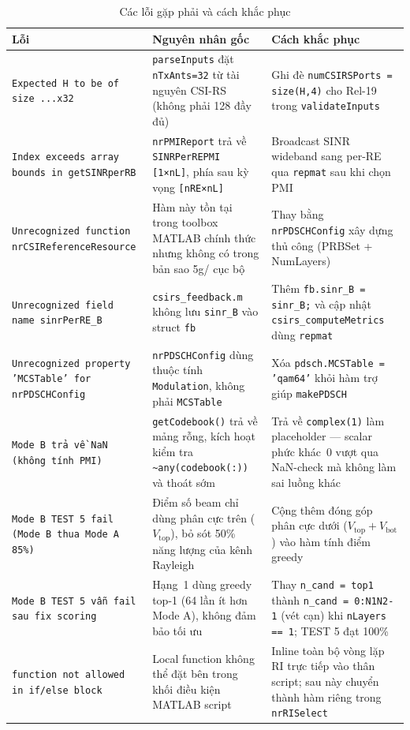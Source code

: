 \documentclass[11pt,a4paper]{article}
\begin{document}
\begin{table}[h!]
\centering
\caption{Các lỗi gặp phải và cách khắc phục}
\label{tab:errors}
\begin{tabular}{p{4cm}p{5cm}p{5cm}}
\toprule
\textbf{Lỗi} & \textbf{Nguyên nhân gốc} & \textbf{Cách khắc phục} \\
\midrule
\texttt{Expected H to be of size ...x32} &
\texttt{parseInputs} đặt \texttt{nTxAnts=32} từ tài nguyên CSI-RS (không phải 128 đầy đủ) &
Ghi đè \texttt{numCSIRSPorts = size(H,4)} cho Rel-19 trong \texttt{validateInputs} \\
\addlinespace
\texttt{Index exceeds array bounds in getSINRperRB} &
\texttt{nrPMIReport} trả về \texttt{SINRPerREPMI [1×nL]}, phía sau kỳ vọng \texttt{[nRE×nL]} &
Broadcast SINR wideband sang per-RE qua \texttt{repmat} sau khi chọn PMI \\
\addlinespace
\texttt{Unrecognized function nrCSIReferenceResource} &
Hàm này tồn tại trong toolbox MATLAB chính thức nhưng không có trong bản sao 5g/ cục bộ &
Thay bằng \texttt{nrPDSCHConfig} xây dựng thủ công (PRBSet + NumLayers) \\
\addlinespace
\texttt{Unrecognized field name sinrPerRE\_B} &
\texttt{csirs\_feedback.m} không lưu \texttt{sinr\_B} vào struct \texttt{fb} &
Thêm \texttt{fb.sinr\_B = sinr\_B;} và cập nhật \texttt{csirs\_computeMetrics} dùng \texttt{repmat} \\
\addlinespace
\texttt{Unrecognized property 'MCSTable' for nrPDSCHConfig} &
\texttt{nrPDSCHConfig} dùng thuộc tính \texttt{Modulation}, không phải \texttt{MCSTable} &
Xóa \texttt{pdsch.MCSTable = 'qam64'} khỏi hàm trợ giúp \texttt{makePDSCH} \\
\addlinespace
\texttt{Mode B trả về NaN (không tính PMI)} &
\texttt{getCodebook()} trả về mảng rỗng, kích hoạt kiểm tra \texttt{\textasciitilde any(codebook(:))} và thoát sớm &
Trả về \texttt{complex(1)} làm placeholder --- scalar phức khác~0 vượt qua NaN-check mà không làm sai luồng khác \\
\addlinespace
\texttt{Mode B TEST 5 fail (Mode B thua Mode A 85\%)} &
Điểm số beam chỉ dùng phân cực trên ($V_\text{top}$), bỏ sót 50\% năng lượng của kênh Rayleigh &
Cộng thêm đóng góp phân cực dưới ($V_\text{top} + V_\text{bot}$) vào hàm tính điểm greedy \\
\addlinespace
\texttt{Mode B TEST 5 vẫn fail sau fix scoring} &
Hạng~1 dùng greedy top-1 (64 lần ít hơn Mode A), không đảm bảo tối ưu &
Thay \texttt{n\_cand = top1} thành \texttt{n\_cand = 0:N1N2-1} (vét cạn) khi \texttt{nLayers == 1}; TEST 5 đạt 100\% \\
\addlinespace
\texttt{function not allowed in if/else block} &
Local function không thể đặt bên trong khối điều kiện MATLAB script &
Inline toàn bộ vòng lặp RI trực tiếp vào thân script; sau này chuyển thành hàm riêng trong \texttt{nrRISelect} \\
\bottomrule
\end{tabular}
\end{table}
\end{document}
